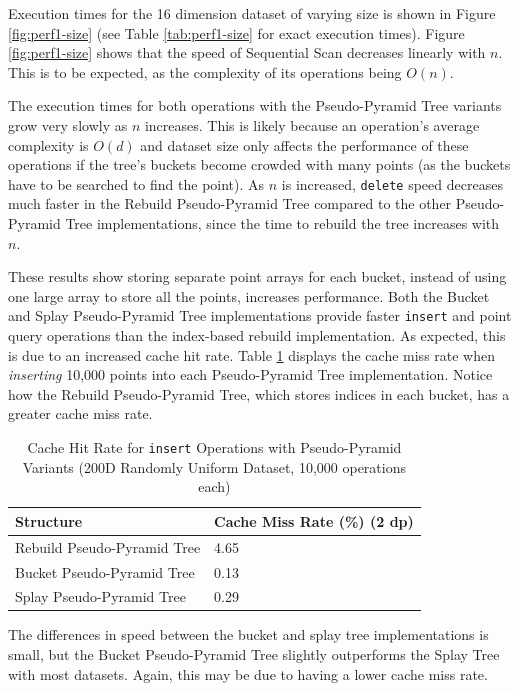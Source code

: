 Execution times for the 16 dimension dataset of varying size is shown in Figure \ref{fig:perf1-size} (see Table \ref{tab:perf1-size} for exact execution times). Figure \ref{fig:perf1-size} shows that the speed of Sequential Scan decreases linearly with $n$. This is to be expected, as the complexity of its operations being $O(n)$.

The execution times for both operations with the Pseudo-Pyramid Tree variants grow very slowly as $n$ increases. This is likely because an operation's average complexity is $O(d)$ and dataset size only affects the performance of these operations if the tree's buckets become crowded with many points (as the buckets have to be searched to find the point). As $n$ is increased, \texttt{delete} speed decreases much faster in the Rebuild Pseudo-Pyramid Tree compared to the other Pseudo-Pyramid Tree implementations, since the time to rebuild the tree increases with $n$.

These results show storing separate point arrays for each bucket, instead of using one large array to store all the points, increases performance. Both the Bucket and Splay Pseudo-Pyramid Tree implementations provide faster \texttt{insert} and point query operations than the index-based rebuild implementation. As expected, this is due to an increased cache hit rate. Table \ref{tab:perf1-cache-hit-rate} displays the cache miss rate when \textit{inserting} 10,000 points into each Pseudo-Pyramid Tree implementation. Notice how the Rebuild Pseudo-Pyramid Tree, which stores indices in each bucket, has a greater cache miss rate. 

\begin{table}
	\centering
	\begin{tabular}{|l|l|}
		\hline
		\textbf{Structure} & \textbf{Cache Miss Rate (\%) (2 dp)} \\
		\hline
		Rebuild Pseudo-Pyramid Tree & 4.65 \\
		Bucket Pseudo-Pyramid Tree & 0.13 \\
		Splay Pseudo-Pyramid Tree & 0.29 \\
		\hline
	\end{tabular}
	\caption{Cache Hit Rate for \texttt{insert} Operations with Pseudo-Pyramid Variants (200D Randomly Uniform Dataset, 10,000 operations each)}
	\label{tab:perf1-cache-hit-rate}
\end{table}

The differences in speed between the bucket and splay tree implementations is small, but the Bucket Pseudo-Pyramid Tree slightly outperforms the Splay Tree with most datasets. Again, this may be due to having a lower cache miss rate. 

